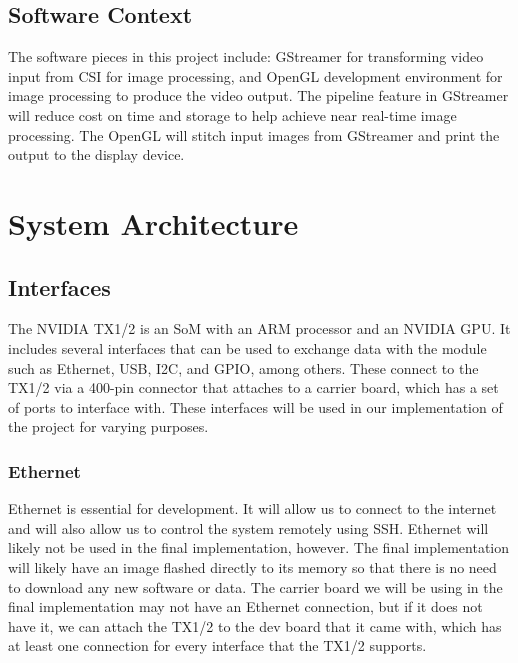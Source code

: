 \documentclass[letterpaper,10pt,serif,draftclsnofoot,onecolumn,compsoc,titlepage]{IEEEtran}
\begin{document}
\subsection{Software Context}

The software pieces in this project include: GStreamer for transforming video input 
from CSI for image processing, and OpenGL development environment for image processing 
to produce the video output. The pipeline feature in GStreamer will reduce 
cost on time and storage to help achieve near real-time image processing. The OpenGL 
will stitch input images from GStreamer and print the output to the display device. \\

\section{System Architecture}

\subsection{Interfaces}

The NVIDIA TX1/2 is an SoM with an ARM processor and an NVIDIA GPU. It includes several 
interfaces that can be used to exchange data with the module such as Ethernet, USB, 
I2C, and GPIO, among others. These connect to the TX1/2 via a 400-pin connector that 
attaches to a carrier board, which has a set of ports to interface with. These 
interfaces will be used in our implementation of the project for varying purposes. \\

\subsubsection{Ethernet}

Ethernet is essential for development. It will allow us to connect to the internet and 
will also allow us to control the system remotely using SSH. Ethernet will likely not 
be used in the final implementation, however. The final implementation will likely 
have an image flashed directly to its memory so that there is no need to download any 
new software or data. The carrier board we will be using in the final implementation 
may not have an Ethernet connection, but if it does not have it, we can attach the TX1/2 
to the dev board that it came with, which has at least one connection for every 
interface that the TX1/2 supports. \\
\end{document}
